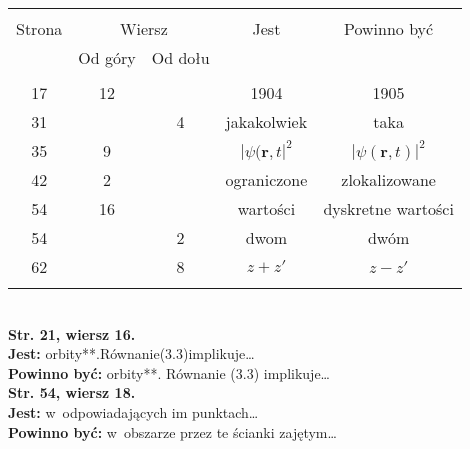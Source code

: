\begin{center}
  \begin{tabular}{|c|c|c|c|c|}
    \hline
    & \multicolumn{2}{c|}{} & & \\
    Strona & \multicolumn{2}{c|}{Wiersz} & Jest & Powinno być \\ \cline{2-3}
    & Od góry & Od dołu &  &  \\ \hline
    & & & & \\
    17 & 12 & & 1904 & 1905 \\
    31 & & 4 & jakakolwiek & taka \\
    35 & 9 & & $| \psi( \mathbf{r}, t |^{ 2 }$ & $| \psi( \mathbf{r}, t ) |^{ 2 }$ \\
    42 & 2 & & ograniczone & zlokalizowane \\
    54 & 16 & & wartości & dyskretne wartości \\
    54 & & 2 & dwom & dwóm \\
    62 & & 8 & $z + z'$ & $z - z'$ \\
    & & & & \\ \hline
  \end{tabular}
\end{center}
\noindent\\
\textbf{Str. 21, wiersz 16.}\\
\textbf{Jest:} orbity**.Równanie(3.3)implikuje\ldots \\
\textbf{Powinno być:} orbity**. Równanie (3.3) implikuje\ldots \\
\textbf{Str. 54, wiersz 18.}\\
\textbf{Jest:} w~odpowiadających im punktach\ldots \\
\textbf{Powinno być:} w~obszarze przez te ścianki zajętym\ldots \\
